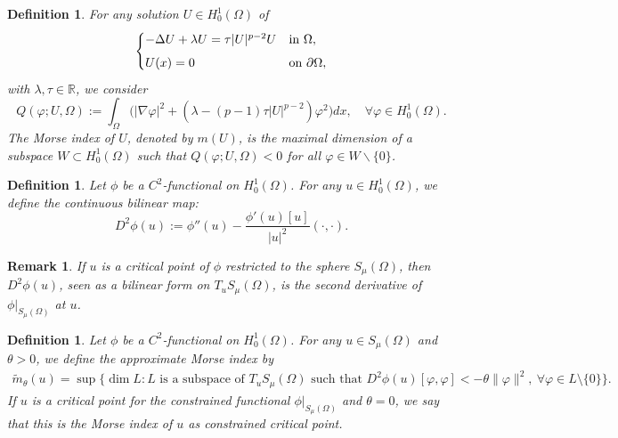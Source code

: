 \documentclass[10pt,a4paper]{article}
\newtheorem{definition}[theorem]{Definition}
\newtheorem{remark}[theorem]{Remark}
\theoremstyle{definition} \theoremstyle{remark}
\numberwithin{equation}{section}
\newcommand{\R}{\mathbb{R}}
\newcommand{\la}{\lambda}
\begin{document}
\begin{definition} \label{defmorseind}
	For any solution $U \in H^1_0(\Omega)$ of
	\begin{equation}
		\begin{cases}
			-\Delta U + \lambda U = \tau |U|^{p-2}U
			& \text{in } \Omega, \\[1.5\jot]
			\displaystyle
			U(x) = 0
			&\text{on } \partial \Omega,
		\end{cases}
	\end{equation}
	with $\la, \tau \in \R$, we consider
	\begin{equation*}
		Q(\varphi; U, \Omega)
		:= \int_{\Omega} \bigl(|\nabla \varphi|^2
		+ (\lambda- (p-1)\tau|U|^{p-2}) \varphi^2\bigr) dx, \quad \forall \varphi \in H_0^1(\Omega).
	\end{equation*}
	The Morse index of $U$, denoted by $m(U)$, is the maximal dimension of a subspace $W \subset H_0^1(\Omega)$ such that $Q(\varphi; U, \Omega) <0$ for all $\varphi \in W \backslash \{0\}$.
\end{definition}

\begin{definition}\label{def D}
	Let $\phi$ be a $C^2$-functional on $H_0^1(\Omega)$.  For any $u\in H_0^1(\Omega)$, we
	define the continuous bilinear map:
	\begin{equation*}
		D^2\phi(u)
		:= \phi''(u) - \frac{\phi'(u)[u]}{|u|^2} (\cdot,\cdot).
	\end{equation*}
\end{definition}

\begin{remark}
	If $u$ is a critical point of $\phi$ restricted to
	the sphere $S_\mu(\Omega)$, then $D^2 \phi(u)$, seen as a bilinear form on
	$T_u S_\mu(\Omega)$, is the second derivative of $\phi|_{S_\mu(\Omega)}$ at $u$.
\end{remark}


\begin{definition}\label{def: app morse}
	Let $\phi$ be a $C^2$-functional on $H_0^1(\Omega)$. For any $u\in S_\mu(\Omega)$ and
	$\theta > 0$, we define the \emph{approximate Morse index} by
	\begin{align*}
		\tilde m_\theta(u)
		= \sup \bigl\{\dim L: L \text{ is a subspace of }
		T_u S_\mu(\Omega) \text{ such that } D^2\phi(u)[\varphi, \varphi]<-\theta \|\varphi\|^2, \ \forall \varphi \in L \setminus \{0\}
		\bigr\}.
	\end{align*}
	If $u$ is a critical point for the constrained functional
	$\phi|_{S_\mu(\Omega)}$ and $\theta=0$, we say that this is the \emph{Morse
		index of $u$ as constrained critical point}.
\end{definition}
\end{document}
